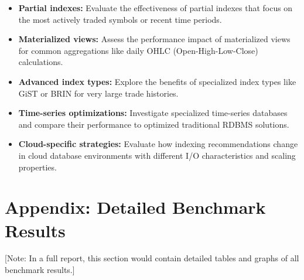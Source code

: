 \documentclass[11pt,a4paper]{article}
\begin{document}
\begin{itemize}
    \item \textbf{Partial indexes:} Evaluate the effectiveness of partial indexes that focus on the most actively traded symbols or recent time periods.
    
    \item \textbf{Materialized views:} Assess the performance impact of materialized views for common aggregations like daily OHLC (Open-High-Low-Close) calculations.
    
    \item \textbf{Advanced index types:} Explore the benefits of specialized index types like GiST or BRIN for very large trade histories.
    
    \item \textbf{Time-series optimizations:} Investigate specialized time-series databases and compare their performance to optimized traditional RDBMS solutions.
    
    \item \textbf{Cloud-specific strategies:} Evaluate how indexing recommendations change in cloud database environments with different I/O characteristics and scaling properties.
\end{itemize}

\section{Appendix: Detailed Benchmark Results}

[Note: In a full report, this section would contain detailed tables and graphs of all benchmark results.]
\end{document}
